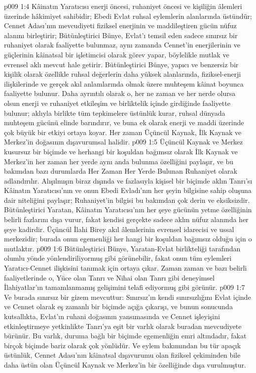 \vs p009 1:4 Kâinatın Yaratıcısı enerji öncesi, ruhaniyet öncesi ve kişiliğin âlemleri üzerinde hâkimiyet sahibidir; Ebedi Evlat ruhsal eylemlerin alanlarında üstündür; Cennet Adası’nın mevcudiyeti fiziksel enerjinin ve maddileştiren gücün nüfuz alanını birleştirir; Bütünleştirici Bünye, Evlat’ı temsil eden sadece sınırsız bir ruhaniyet olarak faaliyette bulunmaz, aynı zamanda Cennet’in enerjilerinin ve güçlerinin kâinatsal bir işletimcisi olarak görev yapar, böylelikle mutlak ve evrensel aklı mevcut hale getirir. Bütünleştirici Bünye, yapıcı ve benzersiz bir kişilik olarak özellikle ruhsal değerlerin daha yüksek alanlarında, fiziksel\hyp{}enerji ilişkilerinde ve gerçek akıl anlamlarında olmak üzere muhteşem kâinat boyunca faaliyette bulunur. Daha ayrıntılı olarak o, her ne zaman ve her nerde olursa olsun enerji ve ruhaniyet etkileşim ve birliktelik içinde girdiğinde faaliyette bulunur; aklıyla birlikte tüm tepkimelere üstünlük kurar, ruhsal dünyada muhteşem gücünü elinde barındırır, ve buna ek olarak enerji ve maddi üzerinde çok büyük bir etkiyi ortaya koyar. Her zaman Üçüncül Kaynak, İlk Kaynak ve Merkez’in doğasının dışavurumsal halidir.
\vs p009 1:5 Üçüncül Kaynak ve Merkez kusursuz bir biçimde ve herhangi bir koşuldan bağımsız olarak İlk Kaynak ve Merkez’in her zaman her yerde aynı anda bulunma özelliğini paylaşır, ve bu bakımdan bazı durumlarda Her Zaman Her Yerde Bulunan Ruhaniyet olarak adlandırılır. Alışılmışın biraz dışında ve fazlasıyla kişisel bir biçimde aklın Tanrı’sı Kâinatın Yaratıcısı’nın ve onun Ebedi Evladı’nın her şeyin bilgisine sahip oluşuna dair niteliğini paylaşır; Ruhaniyet’in bilgisi bu bakımdan çok derin ve eksiksizdir. Bütünleştirici Yaratan, Kâinatın Yaratıcısı’nın her şeye gücünün yetme özelliğinin belirli fazlarını dışa vurur, fakat kendisi gerçekte sadece aklın nüfuz alanında her şeye kadirdir. Üçüncül İlahi Birey akıl âlemlerinin evrensel idarecisi ve ussal merkezidir; burada onun egemenliği her hangi bir koşuldan bağımsız olduğu için o mutlaktır.
\vs p009 1:6 Bütünleştirici Bünye, Yaratan\hyp{}Evlat birlikteliği tarafından olumlu yönde yönlendiriliyormuş gibi görünebilir, fakat onun tüm eylemleri Yaratıcı\hyp{}Cennet ilişkisini tanımak için ortaya çıkar. Zaman zaman ve bazı belirli faaliyetlerinde o, Yüce olan Tanrı ve Nihai olan Tanrı gibi deneyimsel İlahiyatlar’ın tamamlanmamış gelişimini telafi ediyormuş gibi görünür.
\vs p009 1:7 Ve burada sınırsız bir gizem mevcuttur: Sınırsız’ın kendi sınırsızlığını Evlat içinde ve Cennet olarak eş zamanlı bir biçimde açığa çıkarışı, ve bunun sonucunda kutsallıkta, Evlat’ın ruhani doğasının yansımasında ve Cennet işleyişini etkinleştirmeye yetkinlikte Tanrı’ya eşit bir varlık olarak buradan mevcudiyete bürünür. Bu varlık, duruma bağlı bir biçimde egemenliğin emri altındadır, fakat birçok biçimde  bariz olarak çok yönlüdür. Ve eylem bakımından bu tür apaçık üstünlük, Cennet Adası’nın kâinatsal dışavurumu olan fiziksel çekiminden bile daha üstün olan Üçüncül Kaynak ve Merkez’in bir özelliğinde dışa vurulmuştur.
